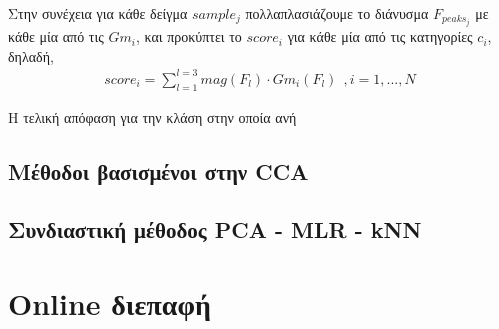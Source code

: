 \documentclass[11pt,a4paper,english,greek,twoside]{../Thesis}
\begin{document}
\par Στην συνέχεια για κάθε δείγμα $sample_j$ πολλαπλασιάζουμε το διάνυσμα $F_{peaks_j}$ με κάθε μία από τις $Gm_i$, και προκύπτει το $score_i$ για κάθε μία από τις κατηγορίες $c_i$, δηλαδή,
\begin{align}
    score_i=\sum_{l=1}^{l=3} mag(F_l)\cdot Gm_i(F_l) \ \ , i =1,...,N
\end{align}
\par Η τελική απόφαση για την κλάση στην οποία ανή
\subsection{Μέθοδοι βασισμένοι στην CCA}

\subsection{Συνδιαστική μέθοδος PCA - MLR - kNN}


\section{Online διεπαφή}
\end{document}
